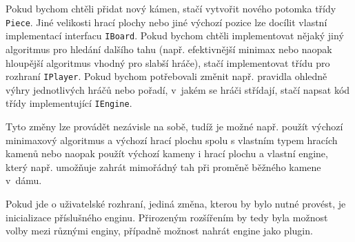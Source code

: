 \documentclass[a4paper,12pt]{article}
\renewcommand{\tt}[1]{\texttt{#1}}
\begin{document}
	Pokud bychom chtěli přidat nový kámen, stačí vytvořit nového potomka třídy \tt{Piece}. Jiné velikosti hrací plochy nebo jiné výchozí pozice lze docílit vlastní implementací interfacu \tt{IBoard}. Pokud bychom chtěli implementovat nějaký jiný algoritmus pro hledání dalšího tahu (např. efektivnější minimax nebo naopak hloupější algoritmus vhodný pro slabší hráče), stačí implementovat třídu pro rozhraní \tt{IPlayer}. Pokud bychom potřebovali změnit např. pravidla ohledně výhry jednotlivých hráčů nebo pořadí, v~jakém se hráči střídají, stačí napsat kód třídy implementující \tt{IEngine}.
	
	Tyto změny lze provádět nezávisle na sobě, tudíž je možné např. použít výchozí minimaxový algoritmus a výchozí hrací plochu spolu s vlastním typem hracích kamenů nebo naopak použít výchozí kameny i hrací plochu a vlastní engine, který např. umožňuje zahrát mimořádný tah při proměně běžného kamene v~dámu.
	
	Pokud jde o uživatelské rozhraní, jediná změna, kterou by bylo nutné provést, je inicializace příslušného enginu.
	Přirozeným rozšířením by tedy byla možnost volby mezi různými enginy, případně možnost nahrát engine jako plugin.
	
\end{document}
